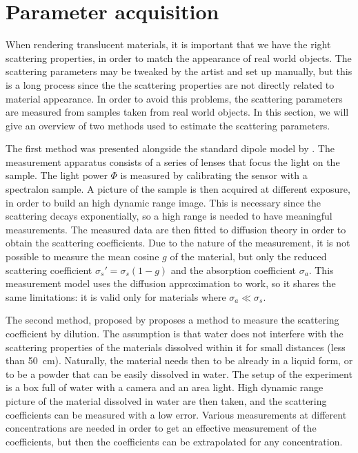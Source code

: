 \section{Parameter acquisition}
When rendering translucent materials, it is important that we have the right scattering properties, in order to match the appearance of real world objects. The scattering parameters may be tweaked by the artist and set up manually, but this is a long process since the the scattering properties are not directly related to material appearance. In order to avoid this problems, the scattering parameters are measured from samples taken from real world objects. In this section, we will give an overview of two methods used to estimate the scattering parameters.

The first method was presented alongside the standard dipole model by \cite{Jensen:2001:PMS:383259.383319}. The measurement apparatus consists of a series of lenses that focus the light on the sample. The light power $\Phi$ is measured by calibrating the sensor with a spectralon sample. A picture of the sample is then acquired at different exposure, in order to build an high dynamic range image. This is necessary since the scattering decays exponentially, so a high range is needed to have meaningful measurements. The measured data are then fitted to diffusion theory in order to obtain the scattering coefficients. Due to the nature of the measurement, it is not possible to measure the mean cosine $g$ of the material, but only the reduced scattering coefficient $\sigma_s' = \sigma_s (1 - g)$ and the absorption coefficient $\sigma_a$. This measurement model uses the diffusion approximation to work, so it shares the same limitations: it is valid only for materials where $\sigma_a \ll \sigma_s$.

The second method, proposed by \cite{Narasimhan:2006:ASP:1141911.1141986} proposes a method to measure the scattering coefficient by dilution. The assumption is that water does not interfere with the scattering properties of the materials dissolved within it for small distances (less than \SI{50}{cm}). Naturally, the material needs then to be already in  a liquid form, or to be a powder that can be easily dissolved in water. The setup of the experiment is a box full of water with a camera and an area light. High dynamic range picture of the material dissolved in water are then taken, and the scattering coefficients can be measured with a low error. Various measurements at different concentrations are needed in order to get an effective measurement of the coefficients, but then the coefficients can be extrapolated for any concentration. 

